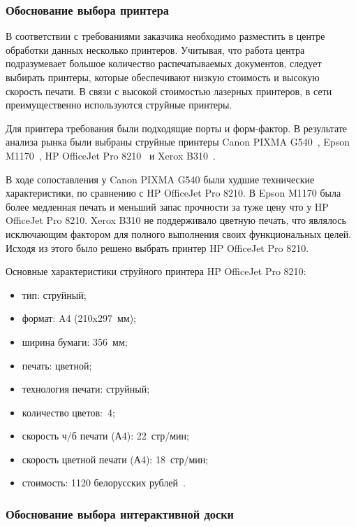 \subsubsection{Обоснование выбора принтера}

В соответствии с требованиями заказчика необходимо разместить в центре обработки данных несколько принтеров. Учитывая, что работа центра подразумевает большое количество распечатываемых документов, следует выбирать принтеры, которые обеспечивают низкую стоимость и высокую скорость печати. В связи с высокой стоимостью лазерных принтеров, в сети преимущественно используются струйные принтеры. 

Для принтера требования были подходящие порты и форм-фактор. В результате анализа рынка были выбраны струйные принтеры Canon PIXMA G540~\cite{canon_pixmag540}, Epson M1170~\cite{epson_c11ch44404}, HP OfficeJet Pro 8210~\cite{hp_d9l63a} и Xerox B310~\cite{xerox/b310vdni}.

В ходе сопоставления у Canon PIXMA G540 были худшие технические характеристики, по сравнению с HP OfficeJet Pro 8210. В Epson M1170 была более медленная печать и меньший запас прочности за туже цену что у HP OfficeJet Pro 8210. Xerox B310 не поддерживало цветную печать, что являлось исключающим фактором для полного выполнения своих функциональных целей. Исходя из этого было решено выбрать принтер HP OfficeJet Pro 8210.

Основные характеристики струйного принтера HP OfficeJet Pro 8210:
\begin{itemize}
    \item тип: струйный;
    \item формат: A4 (210x297~мм);
    \item ширина бумаги: 356~мм;
    \item печать: цветной;
    \item технология печати: струйный;
    \item количество цветов:~4;
    \item скорость ч/б печати (А4): 22~стр/мин;
    \item скорость цветной печати (А4): 18~стр/мин;
    \item стоимость: 1120 белорусских рублей~\cite{hp_d9l63a}.
\end{itemize}

\subsubsection{Обоснование выбора интерактивной доски}

